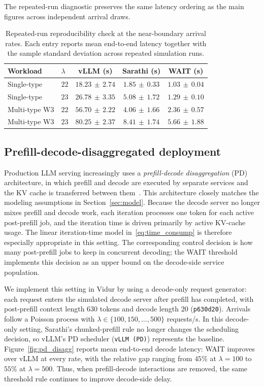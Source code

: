 The repeated-run diagnostic preserves the same latency ordering as the main figures across independent arrival draws.

\begin{table}[ht]
\centering
\small
\begin{tabular}{llccc}
\toprule
Workload & $\lambda$ & vLLM (s) & Sarathi (s) & WAIT (s) \\
\midrule
Single-type & $22$ & $18.23\,\pm\,2.74$ & $1.85\,\pm\,0.33$ & $\mathbf{1.03\,\pm\,0.04}$ \\
Single-type & $23$ & $26.78\,\pm\,3.35$ & $5.08\,\pm\,1.72$ & $\mathbf{1.29\,\pm\,0.10}$ \\
Multi-type W3 & $22$ & $56.70\,\pm\,2.22$ & $4.06\,\pm\,1.66$ & $\mathbf{2.36\,\pm\,0.57}$ \\
Multi-type W3 & $23$ & $80.25\,\pm\,2.37$ & $8.41\,\pm\,1.74$ & $\mathbf{5.66\,\pm\,1.88}$ \\
\bottomrule
\end{tabular}
\caption{Repeated-run reproducibility check at the near-boundary arrival rates. Each entry reports mean end-to-end latency together with the sample standard deviation across repeated simulation runs.}
\label{tab:multi_seed}
\end{table}

\subsection{Prefill-decode-disaggregated deployment}
\label{app:pd_disagg}

Production LLM serving increasingly uses a \emph{prefill-decode disaggregation} (PD) architecture, in which prefill and decode are executed by separate services and the KV cache is transferred between them~\citep{patel2024splitwise,zhong2024distserve}. This architecture closely matches the modeling assumptions in Section~\ref{sec:model}. Because the decode server no longer mixes prefill and decode work, each iteration processes one token for each active post-prefill job, and the iteration time is driven primarily by active KV-cache usage. The linear iteration-time model in~\eqref{eq:time_consump} is therefore especially appropriate in this setting. The corresponding control decision is how many post-prefill jobs to keep in concurrent decoding; the WAIT threshold implements this decision as an upper bound on the decode-side service population.

We implement this setting in Vidur by using a decode-only request generator: each request enters the simulated decode server after prefill has completed, with post-prefill context length $630$ tokens and decode length $20$ (\texttt{p630d20}). Arrivals follow a Poisson process with $\lambda \in \{100, 150, \ldots, 500\}$ requests/s. In this decode-only setting, Sarathi's chunked-prefill rule no longer changes the scheduling decision, so vLLM's PD scheduler (\texttt{vLLM (PD)}) represents the baseline. Figure~\ref{fig:pd_disagg} reports mean end-to-end decode latency: WAIT improves over vLLM at every rate, with the relative gap ranging from $45\%$ at $\lambda = 100$ to $55\%$ at $\lambda = 500$. Thus, when prefill-decode interactions are removed, the same threshold rule continues to improve decode-side delay.

